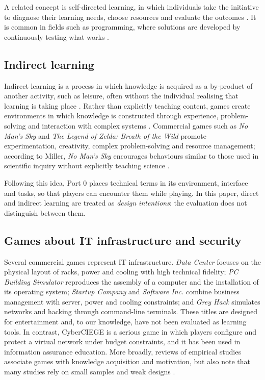 \documentclass[runningheads]{llncs}
\begin{document}
A related concept is self-directed learning, in which individuals take the initiative to diagnose their learning needs, choose resources and evaluate the outcomes \cite{knowles1975}. It is common in fields such as programming, where solutions are developed by continuously testing what works \cite{BaxterWebb2016}.

\subsection{Indirect learning}

Indirect learning is a process in which knowledge is acquired as a by-product of another activity, such as leisure, often without the individual realising that learning is taking place \cite{Lindberg2019,BaxterWebb2016}. Rather than explicitly teaching content, games create environments in which knowledge is constructed through experience, problem-solving and interaction with complex systems \cite{Monica_Miller}. Commercial games such as \textit{No Man's Sky} \cite{NoMansSky} and \textit{The Legend of Zelda: Breath of the Wild} \cite{BOTW} promote experimentation, creativity, complex problem-solving and resource management; according to Miller, \textit{No Man's Sky} encourages behaviours similar to those used in scientific inquiry without explicitly teaching science \cite{Monica_Miller}.

Following this idea, Port 0 places technical terms in its environment, interface and tasks, so that players can encounter them while playing. In this paper, direct and indirect learning are treated as \emph{design intentions}: the evaluation does not distinguish between them.

\subsection{Games about IT infrastructure and security}

Several commercial games represent IT infrastructure. \textit{Data Center} \cite{datacenter} focuses on the physical layout of racks, power and cooling with high technical fidelity; \textit{PC Building Simulator} \cite{pcbs} reproduces the assembly of a computer and the installation of its operating system; \textit{Startup Company} \cite{startup} and \textit{Software Inc.} \cite{softinc} combine business management with server, power and cooling constraints; and \textit{Grey Hack} \cite{greyhack} simulates networks and hacking through command-line terminals. These titles are designed for entertainment and, to our knowledge, have not been evaluated as learning tools. In contrast, CyberCIEGE \cite{cyberciege} is a serious game in which players configure and protect a virtual network under budget constraints, and it has been used in information assurance education. More broadly, reviews of empirical studies associate games with knowledge acquisition and motivation, but also note that many studies rely on small samples and weak designs \cite{connolly2012}.
\end{document}
